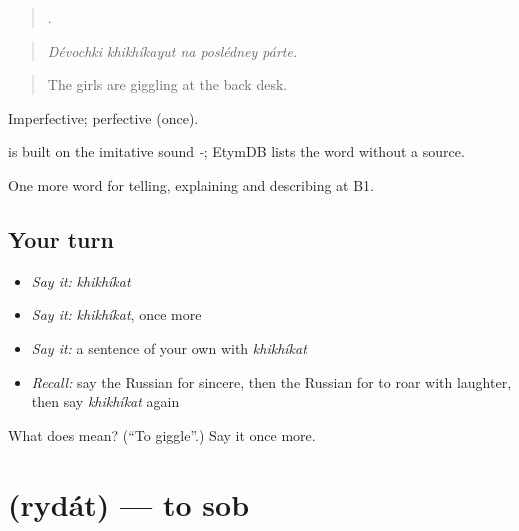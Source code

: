 \begin{quote}
    .
\end{quote}

\begin{quote}
\emph{Dévochki khikhíkayut na poslédney párte.}
\end{quote}

\begin{quote}
The girls are giggling at the back desk.
\end{quote}

Imperfective; perfective  (once).

\begin{cousinweb}
\emph{} is built on the imitative sound \emph{-}; EtymDB lists the word without a source.
\end{cousinweb}

\begin{grammarlens}[title={What you've built}]
One more word for telling, explaining and describing at B1.
\end{grammarlens}

\subsection*{Your turn}
\begin{itemize}
\raggedright
  \item \emph{Say it:} \emph{khikhíkat}
  \item \emph{Say it:} \emph{khikhíkat}, once more
  \item \emph{Say it:} a sentence of your own with \emph{khikhíkat}
  \item \emph{Recall:} say the Russian for sincere, then the Russian for to roar with laughter, then say \emph{khikhíkat} again
\end{itemize}

\begin{tcolorbox}[breakable,colback=teal!4,colframe=teal!35!black,title={Before you move on}]
What does  mean? (\textquotedblleft{}To giggle\textquotedblright{}.) Say it once more.
\end{tcolorbox}
\section[\texorpdfstring{\ru{рыдать} (rydát)}{рыдать (rydát)}]{ (rydát) — to sob}

\label{lesson:RU-C480-rydat}



